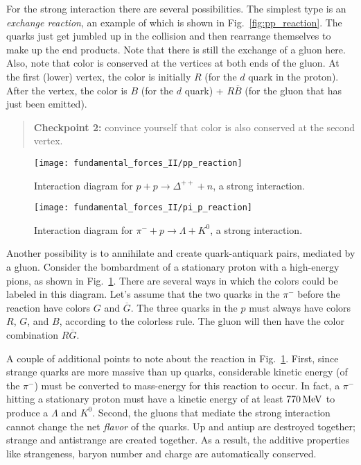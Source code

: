 For the strong interaction there are several possibilities.  The
simplest type is an {\em exchange reaction}, an example of which is
shown in Fig.~\ref{fig:pp_reaction}.  The quarks just get jumbled up
in the collision and then rearrange themselves to make up the end
products.  Note that there is still the exchange of a gluon here.
Also, note that color is conserved at the vertices at both ends of the
gluon.  At the first (lower) vertex, the color is initially $R$ (for
the $d$ quark in the proton).  After the vertex, the color is $B$ (for
the $d$ quark) + $R\overline B$ (for the gluon that has just been
emitted).
\begin{quote}
{\bf Checkpoint 2:} convince yourself that color is also conserved at
the second vertex.
\end{quote}

\begin{figure}[tbp]
\begin{minipage}[t]{5.5cm}
\begin{center}
\texttt{[image: fundamental\_forces\_II/pp\_reaction]}
\caption{Interaction diagram for $p + p \to \Delta^{++} + n$, a strong
  interaction.}
\label{fig:pp_reaction}
\end{center}
\end{minipage}
\hfill
\begin{minipage}[t]{5.5cm}
\begin{center}
\texttt{[image: fundamental\_forces\_II/pi\_p\_reaction]}
\caption{Interaction diagram for $\pi^- + p \to \Lambda + K^0$, a strong
  interaction.}
\label{fig:pi_p_reaction}
\end{center}
\end{minipage}
\end{figure}

Another possibility is to annihilate and create quark-antiquark pairs,
mediated by a gluon.  Consider the bombardment of a stationary proton
with a high-energy pions, as shown in Fig.~\ref{fig:pi_p_reaction}.
There are several ways in which the colors could be labeled in this
diagram.  Let's assume that the two quarks in the $\pi^-$ before the
reaction have colors $G$ and $\overline G$.  The three quarks in the
$p$ must always have colors $R$, $G$, and $B$, according to the
colorless rule.  The gluon will then have the color combination
$R\overline G$.

A couple of additional points to note about the reaction in
Fig.~\ref{fig:pi_p_reaction}. First, since strange quarks are more
massive than up quarks, considerable kinetic energy (of the $\pi^-$)
must be converted to mass-energy for this reaction to occur.  In fact,
a $\pi^-$ hitting a stationary proton must have a kinetic energy of at
least $770\,\mbox{MeV}$ to produce a $\Lambda$ and $K^0$.  Second, the gluons
that mediate the strong interaction cannot change the net {\em flavor}
of the quarks.  Up and antiup are destroyed together; strange and
antistrange are created together.  As a result, the additive
properties like strange\-ness, baryon number and charge are
automatically conserved.

